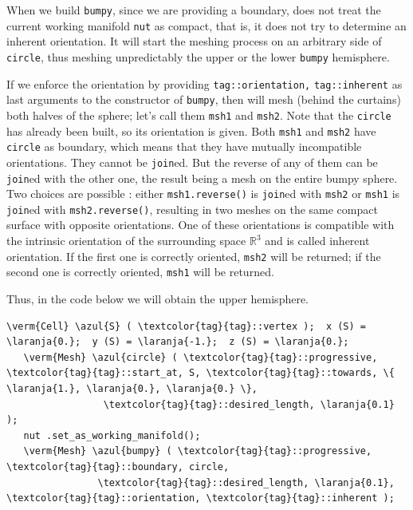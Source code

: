 When we build {\small\tt bumpy}, since we are providing a boundary, {\maniFEM} does not treat
the current working manifold {\small\tt nut} as compact, that is, it does not try to determine an
inherent orientation.
It will start the meshing process on an arbitrary side of {\small\tt circle}, thus meshing
unpredictably the upper or the lower {\small\tt bumpy} hemisphere.

If we enforce the orientation by providing
{\small\tt\textcolor{tag}{tag}::orientation,} {\small\tt\textcolor{tag}{tag}::inherent} as last
arguments to the {\small\tt{}} constructor of {\small\tt bumpy},
then {\maniFEM} will mesh (behind the curtains) both halves of the sphere;
let's call them {\small\tt msh1} and {\small\tt msh2}.
Note that the {\small\tt circle} has already been built, so its orientation is given.
Both {\small\tt msh1} and {\small\tt msh2} have {\small\tt circle} as boundary,
which means that they have mutually incompatible orientations.
They cannot be {\small\tt join}ed.
But the reverse of any of them can be {\small\tt join}ed with the other one, the result being a
mesh on the entire bumpy sphere.
Two choices are possible : either {\small\tt msh1.reverse()} is {\small\tt join}ed with
{\small\tt msh2} or {\small\tt msh1} is {\small\tt join}ed with {\small\tt msh2.reverse()},
resulting in two meshes on the same compact surface with opposite orientations.
One of these orientations is compatible with the intrinsic orientation of the surrounding space
$ \mathbb{R}^3 $ and is called inherent orientation.
If the first one is correctly oriented, {\small\tt msh2} will be returned;
if the second one is correctly oriented, {\small\tt msh1} will be returned.

Thus, in the code below we will obtain the upper hemisphere.

\begin{Verbatim}[commandchars=\\\{\},formatcom=\small\tt,
   baselinestretch=0.94,framesep=2mm                      ]
   \verm{Cell} \azul{S} ( \textcolor{tag}{tag}::vertex );  x (S) = \laranja{0.};  y (S) = \laranja{-1.};  z (S) = \laranja{0.};
   \verm{Mesh} \azul{circle} ( \textcolor{tag}{tag}::progressive, \textcolor{tag}{tag}::start_at, S, \textcolor{tag}{tag}::towards, \{ \laranja{1.}, \laranja{0.}, \laranja{0.} \},
                 \textcolor{tag}{tag}::desired_length, \laranja{0.1}                                         );
   nut .set_as_working_manifold();
   \verm{Mesh} \azul{bumpy} ( \textcolor{tag}{tag}::progressive, \textcolor{tag}{tag}::boundary, circle,
                \textcolor{tag}{tag}::desired_length, \laranja{0.1}, \textcolor{tag}{tag}::orientation, \textcolor{tag}{tag}::inherent );
\end{Verbatim}


